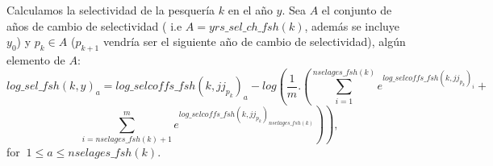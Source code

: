 \documentclass{article}
\begin{document}
\begin{itemize}



Calculamos la selectividad de la pesquería $k$ en el año $y$. Sea $A$ el conjunto de años de cambio de selectividad ( i.e $A= yrs\_sel\_ch\_fsh(k)$, además se incluye $y_0$) y $p_k\in A$ ($p_{k+1}$ vendría ser el siguiente año de cambio de selectividad), algún elemento de $A$:
 \begin{equation}
        log\_sel\_fsh(k,y)_a=log\_selcoffs\_fsh(k,jj_{p_k})_a-log\left(\dfrac{1}{m}.\left(\sum_{i=1}^{nselages\_fsh(k)}e^{log\_selcoffs\_fsh(k,jj_{p_k})_i}+\right.\right.
    \end{equation}
    \begin{equation*}
       \left. \left.\sum_{i=nselages\_fsh(k)+1}^{m}e^{log\_selcoffs\_fsh(k,jj_{p_k})_{nselages\_fsh(k)}}\right)\right), 
    \end{equation*}
   for $\ 1\leq a \leq nselages\_fsh(k)$.\\
   

\end{itemize}
\end{document}
